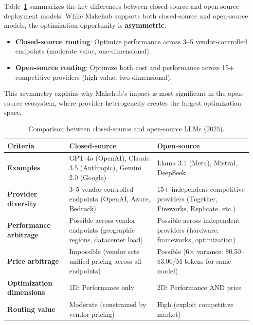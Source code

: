 \documentclass[english]{article}
\begin{document}
Table~\ref{tab:llm_comparison} summarizes the key differences between closed-source and open-source deployment models. While Makehub supports both closed-source and open-source models, the optimization opportunity is \textbf{asymmetric}:

\begin{itemize}
    \item \textbf{Closed-source routing}: Optimize performance across 3--5 vendor-controlled endpoints (moderate value, one-dimensional).
    \item \textbf{Open-source routing}: Optimize both cost and performance across 15+ competitive providers (high value, two-dimensional).
\end{itemize}

This asymmetry explains why Makehub's impact is most significant in the open-source ecosystem, where provider heterogeneity creates the largest optimization space.

\begin{table}[H]
\centering
\caption{Comparison between closed-source and open-source LLMs (2025).}
\label{tab:llm_comparison}
\begin{tabular}{|p{3cm}|p{5.5cm}|p{5.5cm}|}
\hline
\textbf{Criteria} & \textbf{Closed-source} & \textbf{Open-source} \\
\hline
\textbf{Examples} & GPT-4o (OpenAI), Claude 3.5 (Anthropic), Gemini 2.0 (Google) & Llama 3.1 (Meta), Mistral, DeepSeek \\
\hline
\textbf{Provider diversity} & 3--5 vendor-controlled endpoints (OpenAI, Azure, Bedrock) & 15+ independent competitive providers (Together, Fireworks, Replicate, etc.) \\
\hline
\textbf{Performance arbitrage} & Possible across vendor endpoints (geographic regions, datacenter load) & Possible across independent providers (hardware, frameworks, optimization) \\
\hline
\textbf{Price arbitrage} & Impossible (vendor sets unified pricing across all endpoints) & Possible (6× variance: \$0.50--\$3.00/M tokens for same model) \\
\hline
\textbf{Optimization dimensions} & 1D: Performance only & 2D: Performance AND price \\
\hline
\textbf{Routing value} & Moderate (constrained by vendor pricing) & High (exploit competitive market) \\
\hline
\end{tabular}
\end{table}
\end{document}
